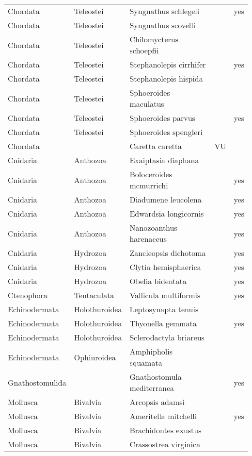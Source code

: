 \begin{longtable}{lllll}
  Chordata & Teleostei & Syngnathus schlegeli &  & yes \\ 
  Chordata & Teleostei & Syngnathus scovelli &  &  \\ 
  Chordata & Teleostei & Chilomycterus schoepfii &  &  \\ 
  Chordata & Teleostei & Stephanolepis cirrhifer &  & yes \\ 
  Chordata & Teleostei & Stephanolepis hispida &  &  \\ 
  Chordata & Teleostei & Sphoeroides maculatus &  &  \\ 
  Chordata & Teleostei & Sphoeroides parvus &  & yes \\ 
  Chordata & Teleostei & Sphoeroides spengleri &  &  \\ 
  Chordata &  & Caretta caretta & VU &  \\ 
  Cnidaria & Anthozoa & Exaiptasia diaphana &  &  \\ 
  Cnidaria & Anthozoa & Boloceroides mcmurrichi &  & yes \\ 
  Cnidaria & Anthozoa & Diadumene leucolena &  & yes \\ 
  Cnidaria & Anthozoa & Edwardsia longicornis &  & yes \\ 
  Cnidaria & Anthozoa & Nanozoanthus harenaceus &  & yes \\ 
  Cnidaria & Hydrozoa & Zancleopsis dichotoma &  & yes \\ 
  Cnidaria & Hydrozoa & Clytia hemisphaerica &  & yes \\ 
  Cnidaria & Hydrozoa & Obelia bidentata &  & yes \\ 
  Ctenophora & Tentaculata & Vallicula multiformis &  & yes \\ 
  Echinodermata & Holothuroidea & Leptosynapta tenuis &  &  \\ 
  Echinodermata & Holothuroidea & Thyonella gemmata &  & yes \\ 
  Echinodermata & Holothuroidea & Sclerodactyla briareus &  &  \\ 
  Echinodermata & Ophiuroidea & Amphipholis squamata &  &  \\ 
  Gnathostomulida &  & Gnathostomula mediterranea &  & yes \\ 
  Mollusca & Bivalvia & Arcopsis adamsi &  &  \\ 
  Mollusca & Bivalvia & Ameritella mitchelli &  & yes \\ 
  Mollusca & Bivalvia & Brachidontes exustus &  &  \\ 
  Mollusca & Bivalvia & Crassostrea virginica &  &  \\ 

\end{longtable}
